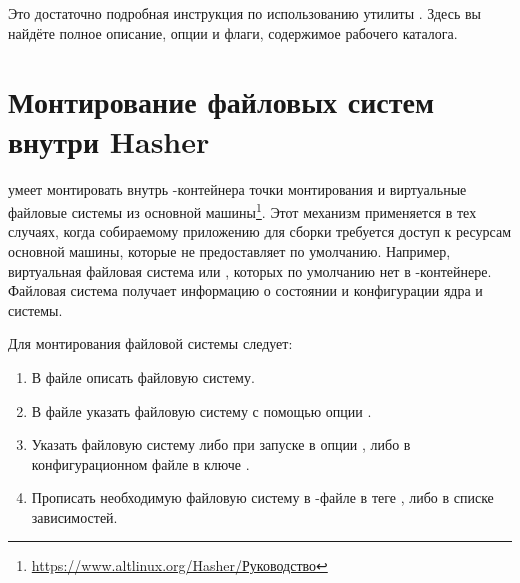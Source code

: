 Это достаточно подробная инструкция по использованию утилиты . Здесь вы найдёте полное описание, опции и флаги, содержимое рабочего каталога. 


\hypertarget{1.3}{\section{Монтирование файловых систем внутри Hasher}}
 умеет монтировать внутрь -контейнера точки монтирования и виртуальные файловые системы из основной машины\footnote{\href{https://www.altlinux.org/Hasher/\%D0\%A0\%D1\%83\%D0\%BA\%D0\%BE\%D0\%B2\%D0\%BE\%D0\%B4\%D1\%81\%D1\%82\%D0\%B2\%D0\%BE\#\%D0\%9C\%D0\%BE\%D0\%BD\%D1\%82\%D0\%B8\%D1\%80\%D0\%BE\%D0\%B2\%D0\%B0\%D0\%BD\%D0\%B8\%D0\%B5_\%D1\%84\%D0\%B0\%D0\%B9\%D0\%BB\%D0\%BE\%D0\%B2\%D1\%8B\%D1\%85_\%D1\%81\%D0\%B8\%D1\%81\%D1\%82\%D0\%B5\%D0\%BC_\%D0\%B2\%D0\%BD\%D1\%83\%D1\%82\%D1\%80\%D0\%B8_hasher}{https://www.altlinux.org/Hasher/Руководство}}. Этот механизм применяется в тех случаях, когда собираемому приложению для сборки требуется доступ к ресурсам основной машины, которые  не предоставляет по умолчанию. Например, виртуальная файловая система  или , которых по умолчанию нет в -контейнере. Файловая система  получает информацию о состоянии и конфигурации ядра и системы.

Для монтирования файловой системы следует:
\begin{enumerate}
	\item В файле  описать файловую систему.
	\item В файле  указать файловую систему с помощью опции .
	\item Указать файловую систему либо при запуске  в опции , либо в конфигурационном файле  в ключе .
	\item Прописать необходимую файловую систему в -файле в теге , либо в списке зависимостей.
\end{enumerate} 